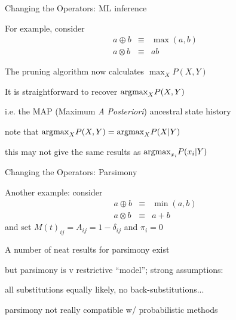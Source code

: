 \documentclass{beamer}
\begin{document}
\begin{frame}{Changing the Operators: ML inference}
\itemb
 \item For example, consider
\begin{eqnarray*}
a \oplus b & \equiv & \max(a,b) \\
a \otimes b & \equiv & ab
\end{eqnarray*}
 \itemb
 \item The pruning algorithm now calculates $\max_X P(X,Y)$
 \item It is straightforward to recover $\mbox{argmax}_X P(X,Y)$
  \itemb
   \item i.e. the MAP (\alert{Maximum {\em A Posteriori}}) ancestral state history
   \item note that $\mbox{argmax}_X P(X,Y) = \mbox{argmax}_X P(X|Y)$
   \item this may not give the same results as $\mbox{argmax}_{x_i} P(x_i|Y)$
  \iteme
 \iteme
\iteme
\end{frame}

\begin{frame}{Changing the Operators: Parsimony}
\itemb
 \item Another example: consider 
\begin{eqnarray*}
a \oplus b & \equiv & \min(a,b) \\
a \otimes b & \equiv & a + b
\end{eqnarray*}
and set $M(t)_{ij} = A_{ij} = 1-\delta_{ij}$ and $\pi_i=0$
\item A number of neat results for parsimony exist
\item but parsimony is v restrictive ``model''; strong assumptions:
 \itemb
 \item all substitutions equally likely, no back-substitutions...
 \item parsimony not really compatible w/ probabilistic methods
 \iteme
\iteme
\end{frame}

% 
% 
\end{document}
